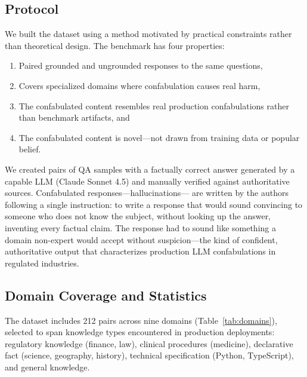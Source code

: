 \documentclass[11pt]{article}
\begin{document}
\subsection{Protocol}

We built the dataset using a method motivated by practical constraints rather than theoretical design. The benchmark has four properties: 
\begin{enumerate}
    \item Paired grounded and ungrounded responses to the same questions, 
    \item Covers specialized domains where confabulation causes real harm, 
    \item The confabulated content resembles real production confabulations rather than benchmark artifacts, and 
    \item The confabulated content is novel---not drawn from training data or popular belief.
\end{enumerate}

We created pairs of QA samples with a factually correct answer generated by a capable LLM (Claude Sonnet 4.5) and manually verified against authoritative sources. Confabulated responses---hallucinations--- are written by the authors following a single instruction: to write a response that would sound convincing to someone who does not know the subject, without looking up the answer, inventing every factual claim. The response had to sound like something a domain non-expert would accept without suspicion---the kind of confident, authoritative output that characterizes production LLM confabulations in regulated industries.

\subsection{Domain Coverage and Statistics}

The dataset includes 212 pairs across nine domains (Table~\ref{tab:domains}), selected to span knowledge types encountered in production deployments: regulatory knowledge (finance, law), clinical procedures (medicine), declarative fact (science, geography, history), technical specification (Python, TypeScript), and general knowledge.
\end{document}
